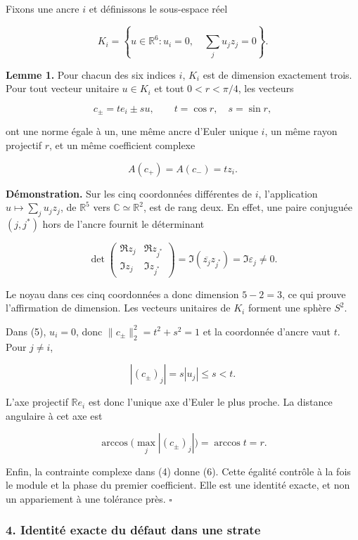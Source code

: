\documentclass[
  10pt,
  a4paper,
]{article}
\begin{document}
Fixons une ancre \(i\) et définissons le sous-espace réel

\[
K_i=\left\{u\in\mathbb R^6:
u_i=0,\quad \sum_j u_jz_j=0\right\}. \tag{4}
\]

\textbf{Lemme 1.} Pour chacun des six indices \(i\), \(K_i\) est de
dimension exactement trois. Pour tout vecteur unitaire \(u\in K_i\) et
tout \(0<r<\pi/4\), les vecteurs

\[
c_\pm= t e_i\pm s u,\qquad t=\cos r,\quad s=\sin r, \tag{5}
\]

ont une norme égale à un, une même ancre d'Euler unique \(i\), un même
rayon projectif \(r\), et un même coefficient complexe

\[
A(c_+)=A(c_-)=t z_i. \tag{6}
\]

\textbf{Démonstration.} Sur les cinq coordonnées différentes de \(i\),
l'application \(u\mapsto\sum_j u_jz_j\), de \(\mathbb R^5\) vers
\(\mathbb C\simeq\mathbb R^2\), est de rang deux. En effet, une paire
conjuguée \((j,j^*)\) hors de l'ancre fournit le déterminant

\[
\det\begin{pmatrix}\Re z_j&\Re z_{j^*}\\
\Im z_j&\Im z_{j^*}\end{pmatrix}
=\Im(\overline{z_j}z_{j^*})
=\Im\varepsilon_j\ne0.
\]

Le noyau dans ces cinq coordonnées a donc dimension \(5-2=3\), ce qui
prouve l'affirmation de dimension. Les vecteurs unitaires de \(K_i\)
forment une sphère \(S^2\).

Dans (5), \(u_i=0\), donc \(\|c_\pm\|_2^2=t^2+s^2=1\) et la coordonnée
d'ancre vaut \(t\). Pour \(j\ne i\),

\[
|(c_\pm)_j|=s|u_j|\le s<t.
\]

L'axe projectif \(\mathbb Re_i\) est donc l'unique axe d'Euler le plus
proche. La distance angulaire à cet axe est

\[
\arccos\bigl(\max_j|(c_\pm)_j|\bigr)=\arccos t=r.
\]

Enfin, la contrainte complexe dans (4) donne (6). Cette égalité contrôle
à la fois le module et la phase du premier coefficient. Elle est une
identité exacte, et non un appariement à une tolérance près. \(\square\)

\hypertarget{identituxe9-exacte-du-duxe9faut-dans-une-strate}{%
\subsubsection{4. Identité exacte du défaut dans une
strate}\label{identituxe9-exacte-du-duxe9faut-dans-une-strate}}
\end{document}
